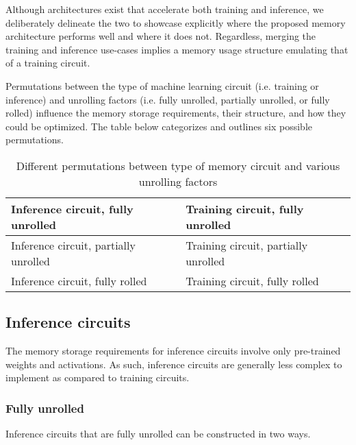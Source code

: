 Although architectures exist that accelerate both training and inference, 
we deliberately delineate the two to showcase explicitly where the proposed memory architecture performs well and where it does not. Regardless, merging the training and inference use-cases implies a memory usage structure emulating that of a training circuit.

Permutations between the type of machine learning circuit (i.e. training or inference) and unrolling factors (i.e. fully unrolled, partially unrolled, or fully rolled) influence the memory storage requirements, their structure, and how they could be optimized. The table below categorizes and outlines six possible permutations.

\begin{table}[h!]
\centering
\caption{Different permutations between type of memory circuit and various unrolling factors}
\label{tab:table1}
\begin{tabular}{l|l}
Inference circuit, fully unrolled & Training circuit, fully unrolled \\ \hline
Inference circuit, partially unrolled & Training circuit, partially unrolled \\ \hline
Inference circuit, fully rolled & Training circuit, fully rolled
\end{tabular}
\end{table}

\subsection{Inference circuits}
\label{context:infcircuits}
The memory storage requirements for inference circuits involve only pre-trained weights and activations. 
As such, inference circuits are generally less complex to implement as compared to training circuits. 

\subsubsection{Fully unrolled}
\label{context:infcircuits-fullyunrolled}
Inference circuits that are fully unrolled can be constructed in two ways. 

